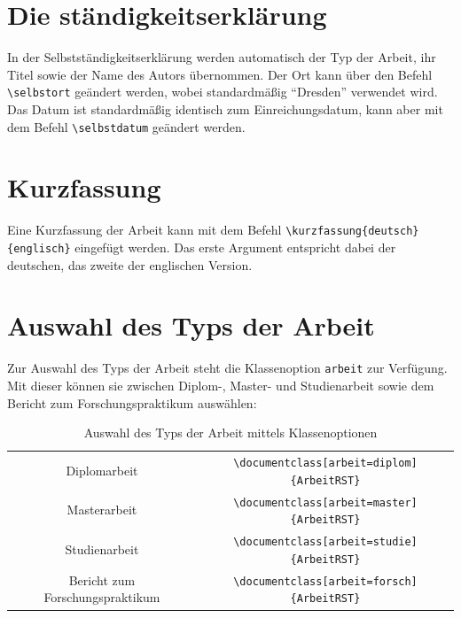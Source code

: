 \section{Die ständigkeitserklärung}
In der Selbstständigkeitserklärung werden automatisch der Typ der Arbeit, ihr Titel sowie der Name des Autors übernommen. Der Ort kann über den Befehl \verb|\selbstort| geändert werden, wobei standardmäßig "`Dresden"' verwendet wird. Das Datum ist standardmäßig identisch zum Einreichungsdatum, kann aber mit dem Befehl \verb|\selbstdatum| geändert werden.



\section{Kurzfassung}
Eine Kurzfassung der Arbeit kann mit dem Befehl \verb|\kurzfassung{deutsch}{englisch}| eingefügt werden. Das erste Argument entspricht dabei der deutschen, das zweite der englischen Version.



\section{Auswahl des Typs der Arbeit}
Zur Auswahl des Typs der Arbeit steht die Klassenoption \texttt{arbeit} zur Verfügung. Mit dieser können sie zwischen Diplom-, Master- und Studienarbeit sowie dem Bericht zum Forschungspraktikum auswählen:
\begin{table}[hbtp]%
\caption{Auswahl des Typs der Arbeit mittels Klassenoptionen}
\centering
\begin{tabular}{cc}
Diplomarbeit & \verb|\documentclass[arbeit=diplom]{ArbeitRST}|\\
Masterarbeit & \verb|\documentclass[arbeit=master]{ArbeitRST}|\\
Studienarbeit & \verb|\documentclass[arbeit=studie]{ArbeitRST}|\\
Bericht zum Forschungspraktikum & \verb|\documentclass[arbeit=forsch]{ArbeitRST}|
\end{tabular}
\label{}
\end{table}



